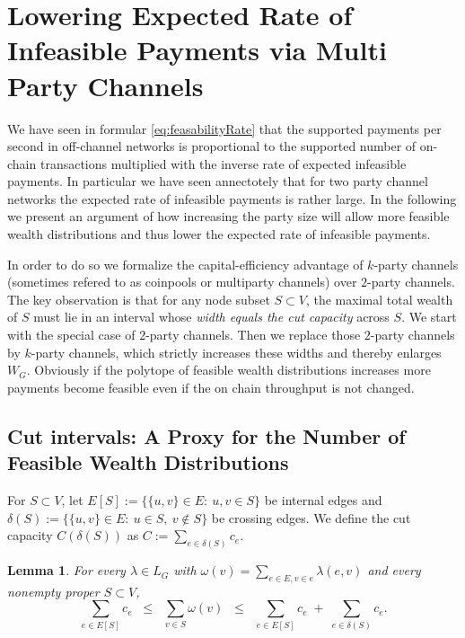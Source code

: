 \documentclass[10pt,twocolumn]{article}
\newtheorem{lemma}[theorem]{Lemma}
\begin{document}
\section{Lowering Expected Rate of Infeasible Payments via Multi Party Channels}
\label{sec:mpc-cuts}
We have seen in formular \ref{eq:feasabilityRate} that the supported payments per second in off-channel networks is proportional to the supported number of on-chain transactions multiplied with the inverse rate of expected infeasible payments. In particular we have seen annectotely that for two party channel networks the expected rate of infeasible payments is rather large. In the following we present an argument of how increasing the party size will allow more feasible wealth distributions and thus lower the expected rate of infeasible payments.%

In order to do so we formalize the capital-efficiency advantage of $k$-party channels (sometimes refered to as coinpools or multiparty channels) over $2$-party channels.
The key observation is that for any node subset $S\subset V$, the maximal total wealth of $S$ must lie in an interval whose \emph{width equals the cut capacity} across $S$.
We start with the special case of $2$-party channels. Then we replace those $2$-party channels by $k$-party channels, which strictly increases these widths and thereby enlarges $W_G$. Obviously if the polytope of feasible wealth distributions increases more payments become feasible even if the on chain throughput is not changed.

\subsection{Cut intervals: A Proxy for the Number of Feasible Wealth Distributions}
\label{subsec:cut-intervals}

For $S\subset V$, let $E[S]:=\{\{u,v\}\in E:\ u,v\in S\}$ be internal edges and
$\delta(S):=\{\{u,v\}\in E:\ u\in S,\ v\notin S\}$ be crossing edges. We define the cut capacity
$C(\delta(S))$ as $C:=\sum_{e\in\delta(S)} c_e$.

\begin{lemma}
\label{lem:cut-interval}
For every $\lambda\in L_G$ with $\omega(v) = \sum_{e\in E,v\in e}\lambda(e,v)$ and every nonempty proper $S\subset V$,
\begin{equation}
\label{eq:cut-interval}
\sum_{e\in E[S]} c_e \;\;\le\;\; \sum_{v\in S}\omega(v) \;\;\le\;\; \sum_{e\in E[S]} c_e \;+\; \sum_{e\in \delta(S)} c_e.
\end{equation}
\end{lemma}
\end{document}
